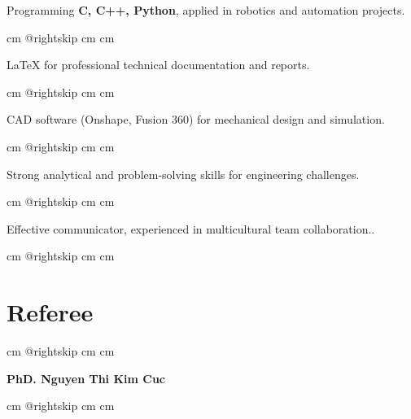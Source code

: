 \documentclass[10pt, letterpaper]{article}
\begin{document}
        Programming \textbf{C, C++, Python}, applied in robotics and automation projects.\par\endgroup
        \vspace{0.2 cm}
        \begingroup{} cm
        \advance\csname @rightskip cm
        \advance{} cm

        LaTeX for professional technical documentation and reports. \par\endgroup
        \vspace{0.2 cm}
        \begingroup{} cm
        \advance\csname @rightskip cm
        \advance{} cm

        CAD software (Onshape, Fusion 360) for mechanical design and simulation. \par\endgroup
        \vspace{0.2 cm}
        \begingroup{} cm
        \advance\csname @rightskip cm
        \advance{} cm

        Strong analytical and problem-solving skills for engineering challenges. \par\endgroup
        \vspace{0.2 cm}
        \begingroup{} cm
        \advance\csname @rightskip cm
        \advance{} cm

        Effective communicator, experienced in multicultural team collaboration.. \par\endgroup
        \vspace{0.2 cm}
        \begingroup{} cm
        \advance\csname @rightskip cm
        \advance{} cm

        
    \section{Referee}

        \begingroup{} cm
        \advance\csname @rightskip cm
        \advance{} cm

        \textbf{PhD. Nguyen Thi Kim Cuc} \par\endgroup

        \vspace{0.2 cm}
        \begingroup{} cm
        \advance\csname @rightskip cm
        \advance{} cm
    
\end{document}
